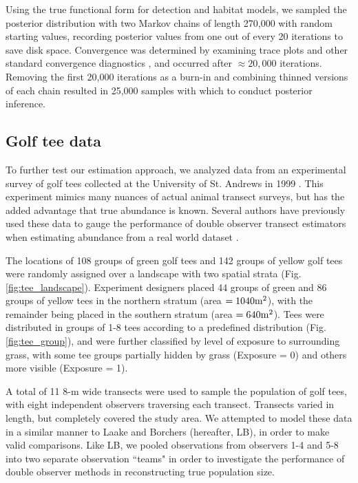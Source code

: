 \documentclass[10pt]{article}
\begin{document}
Using the true functional form for detection and habitat models, we sampled the posterior distribution with two Markov chains of length 270,000 with random starting values, recording posterior values from one out of every 20 iterations to save disk space.  Convergence was determined by examining trace plots and other standard convergence diagnostics \cite{GelmanEtAl2004}, and occurred after $\approx 20,000$ iterations. Removing the first 20,000 iterations as a burn-in and combining thinned versions of each chain resulted in 25,000 samples with which to conduct posterior inference.

\subsection*{Golf tee data}

To further test our estimation approach, we analyzed data from an experimental survey of golf tees
collected at the University of St. Andrews in 1999 \cite{BorchersEtAl2002}.  This experiment mimics many nuances of actual animal transect surveys, but has the added advantage that true abundance is known.  Several authors have previously used these data to gauge the performance of double observer transect estimators when estimating abundance from a real world dataset \cite{BorchersEtAl2002,LaakeBorchers2004}.

The locations of 108 groups of green golf tees and 142 groups of yellow golf tees were randomly assigned over a landscape with two spatial strata (Fig. \ref{fig:tee_landscape}).  Experiment designers placed 44 groups of green and 86 groups of yellow tees in the northern stratum (area $=1040 {\rm m}^2$), with the remainder being placed in the southern stratum (area $=640 {\rm m}^2$).  Tees were distributed in groups of 1-8 tees according to a predefined distribution (Fig. \ref{fig:tee_group}), and were further classified by level of exposure to surrounding grass, with some tee groups partially hidden by grass (Exposure = 0) and others more visible (Exposure = 1).

A total of 11 8-m wide transects were used to sample the population of golf tees, with eight independent observers traversing each transect.  Transects varied in length, but completely covered the study area.  We attempted to model these data in a similar manner to Laake and Borchers \cite{LaakeBorchers2004} (hereafter, LB), in order to make valid comparisons.  Like LB, we pooled observations from observers 1-4 and 5-8 into two separate observation ``teams" in order to investigate the performance of double observer methods in reconstructing true population size.
\end{document}
